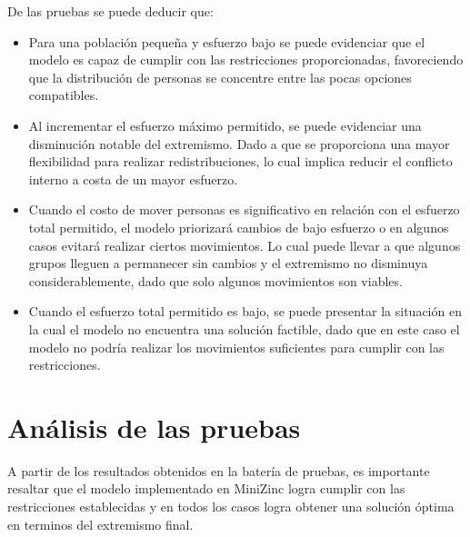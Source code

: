 \documentclass[11pt,letter]{article}
\begin{document}
De las pruebas se puede deducir que:
\begin{itemize}
    \item Para una población pequeña y esfuerzo bajo se puede evidenciar que el modelo es capaz de cumplir con las restricciones proporcionadas, favoreciendo que la distribución de personas se concentre entre las pocas opciones compatibles.

    \item Al incrementar el esfuerzo máximo permitido, se puede evidenciar una disminución notable del extremismo. Dado a que se proporciona una mayor flexibilidad para realizar redistribuciones, lo cual implica reducir el conflicto interno a costa de un mayor esfuerzo.

    \item Cuando el costo de mover personas es significativo en relación con el esfuerzo total permitido, el modelo priorizará cambios de bajo esfuerzo o en algunos casos evitará realizar ciertos movimientos. Lo cual puede llevar a que algunos grupos lleguen a permanecer sin cambios y el extremismo no disminuya considerablemente, dado que solo algunos movimientos son viables.

    \item Cuando el esfuerzo total permitido es bajo, se puede presentar la situación en la cual el modelo no encuentra una solución factible, dado que en este caso el modelo no podría realizar los movimientos suficientes para cumplir con las restricciones.


\end{itemize}



\section{Análisis de las pruebas}

A partir de los resultados obtenidos en la batería de pruebas, es importante resaltar que el modelo implementado en MiniZinc logra cumplir con las restricciones establecidas y en todos los casos logra obtener una solución óptima en terminos del extremismo final. 
\end{document}
